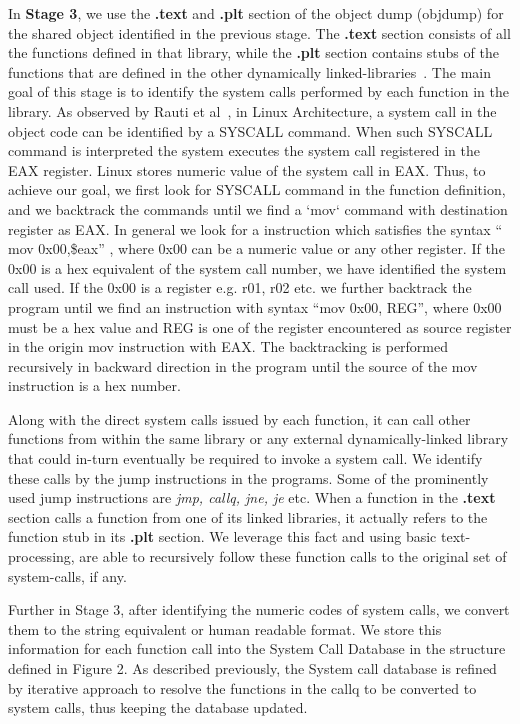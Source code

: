 In \textbf{Stage 3}, we use the \textbf{.text} and \textbf{.plt} section of the object dump (objdump) for the shared object identified in the previous stage. The \textbf{.text} section consists of all the functions defined in that library, while the \textbf{.plt} section contains stubs of the functions that are defined in the other dynamically linked-libraries~\cite{pltsection}. The main goal of this stage is to identify the system calls performed by each function in the library. As observed by Rauti et al~\cite{rauti2014diversification}, in Linux Architecture, a system call in the object code can be identified by a SYSCALL command. When such SYSCALL command is interpreted the system executes the system call registered in the EAX register. Linux stores numeric value of the system call in EAX. Thus, to achieve our goal, we first look for SYSCALL command in the function definition, and we backtrack the commands until we find a  `mov` command with destination register as EAX. In general we look for a instruction which satisfies the syntax “ mov 0x00,\$eax” , where 0x00 can be a numeric value or any other register. If the 0x00 is a hex equivalent of the system call number, we have identified the system call used. If the 0x00 is a register e.g. r01, r02 etc. we further backtrack the program until we find an instruction with syntax “mov 0x00, REG”, where 0x00 must be a hex value and REG is one of the register encountered as source register in the origin mov instruction with EAX. The backtracking is performed recursively in backward direction in the program until the source of the mov instruction is a hex number.

Along with the direct system calls issued by each function, it can call other functions from within the same library or any external dynamically-linked library that could in-turn eventually be required to invoke a system call. We identify these calls by the jump instructions in the programs. Some of the prominently used jump instructions are \textit{jmp, callq, jne, je} etc. When a function in the \textbf{.text} section calls a function from one of its linked libraries, it actually refers to the function stub in its \textbf{.plt} section. We leverage this fact and using basic text-processing, are able to recursively follow these function calls to the original set of system-calls, if any.

Further in Stage 3, after identifying the numeric codes of system calls, we convert them to the string equivalent or human readable format. We store this information for each function call into the System Call Database in the structure defined in Figure 2. As described previously, the System call database is refined by iterative approach to resolve the functions in the callq to be converted to system calls, thus keeping the database updated.

